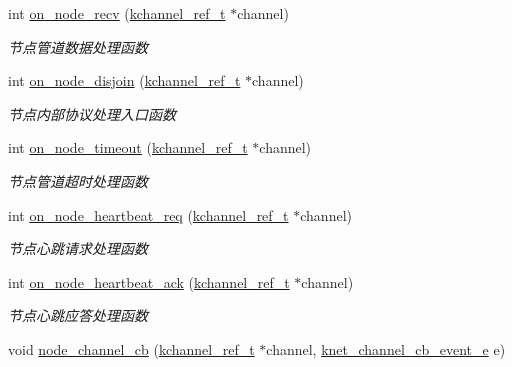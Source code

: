 \begin{DoxyCompactItemize}
int \hyperlink{a00101_afaaf2440e99559696a2376e6d43377b8_afaaf2440e99559696a2376e6d43377b8}{on\+\_\+node\+\_\+recv} (\hyperlink{a00066_a3b7e82599367eade261456f60ebe2cd9_a3b7e82599367eade261456f60ebe2cd9}{kchannel\+\_\+ref\+\_\+t} $\ast$channel)
\begin{DoxyCompactList}\small\item\em 节点管道数据处理函数 \end{DoxyCompactList}\item 
int \hyperlink{a00101_a59bd737cbca597b352194fba73847e09_a59bd737cbca597b352194fba73847e09}{on\+\_\+node\+\_\+disjoin} (\hyperlink{a00066_a3b7e82599367eade261456f60ebe2cd9_a3b7e82599367eade261456f60ebe2cd9}{kchannel\+\_\+ref\+\_\+t} $\ast$channel)
\begin{DoxyCompactList}\small\item\em 节点内部协议处理入口函数 \end{DoxyCompactList}\item 
int \hyperlink{a00101_aba779004280bfcf35ff40461c51a19d4_aba779004280bfcf35ff40461c51a19d4}{on\+\_\+node\+\_\+timeout} (\hyperlink{a00066_a3b7e82599367eade261456f60ebe2cd9_a3b7e82599367eade261456f60ebe2cd9}{kchannel\+\_\+ref\+\_\+t} $\ast$channel)
\begin{DoxyCompactList}\small\item\em 节点管道超时处理函数 \end{DoxyCompactList}\item 
int \hyperlink{a00101_a54b613f98518c8c9f47634b97fe50668_a54b613f98518c8c9f47634b97fe50668}{on\+\_\+node\+\_\+heartbeat\+\_\+req} (\hyperlink{a00066_a3b7e82599367eade261456f60ebe2cd9_a3b7e82599367eade261456f60ebe2cd9}{kchannel\+\_\+ref\+\_\+t} $\ast$channel)
\begin{DoxyCompactList}\small\item\em 节点心跳请求处理函数 \end{DoxyCompactList}\item 
int \hyperlink{a00101_ab83aef21e082207c03bdb5dd9fb07b86_ab83aef21e082207c03bdb5dd9fb07b86}{on\+\_\+node\+\_\+heartbeat\+\_\+ack} (\hyperlink{a00066_a3b7e82599367eade261456f60ebe2cd9_a3b7e82599367eade261456f60ebe2cd9}{kchannel\+\_\+ref\+\_\+t} $\ast$channel)
\begin{DoxyCompactList}\small\item\em 节点心跳应答处理函数 \end{DoxyCompactList}\item 
void \hyperlink{a00101_a01e50baec5274bf618ded8d00678e131_a01e50baec5274bf618ded8d00678e131}{node\+\_\+channel\+\_\+cb} (\hyperlink{a00066_a3b7e82599367eade261456f60ebe2cd9_a3b7e82599367eade261456f60ebe2cd9}{kchannel\+\_\+ref\+\_\+t} $\ast$channel, \hyperlink{a00066_a2fd2faf971268f5b682ab375c455f7c9_a2fd2faf971268f5b682ab375c455f7c9}{knet\+\_\+channel\+\_\+cb\+\_\+event\+\_\+e} e)

\end{DoxyCompactItemize}
